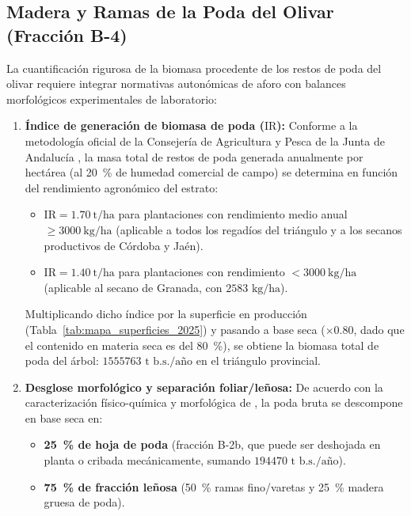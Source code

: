 \documentclass{report}
\begin{document}
\subsection{Madera y Ramas de la Poda del Olivar (Fracción B-4)}
La cuantificación rigurosa de la biomasa procedente de los restos de poda del olivar requiere integrar normativas autonómicas de aforo con balances morfológicos experimentales de laboratorio:
\begin{enumerate}
    \item \textbf{Índice de generación de biomasa de poda ($\text{IR}$):} Conforme a la metodología oficial de la Consejería de Agricultura y Pesca de la Junta de Andalucía \autocite[Sección~3.1.2, Tabla~3]{CAP2008}, la masa total de restos de poda generada anualmente por hectárea (al \SI{20}{\percent} de humedad comercial de campo) se determina en función del rendimiento agronómico del estrato:
    \begin{itemize}
        \item $\text{IR} = \SI{1.70}{\tonne/\hectare}$ para plantaciones con rendimiento medio anual $\ge \SI{3000}{\kilo\gram/\hectare}$ (aplicable a todos los regadíos del triángulo y a los secanos productivos de Córdoba y Jaén).
        \item $\text{IR} = \SI{1.40}{\tonne/\hectare}$ para plantaciones con rendimiento $< \SI{3000}{\kilo\gram/\hectare}$ (aplicable al secano de Granada, con $\num{2583}\text{ kg/ha}$).
    \end{itemize}
    Multiplicando dicho índice por la superficie en producción (Tabla~\ref{tab:mapa_superficies_2025}) y pasando a base seca ($\times 0.80$, dado que el contenido en materia seca es del \SI{80}{\percent}), se obtiene la biomasa total de poda del árbol: $\num{1555763}\text{ t b.s./año}$ en el triángulo provincial.
    \item \textbf{Desglose morfológico y separación foliar/leñosa:} De acuerdo con la caracterización físico-química y morfológica de \textcite{RomeroGarcia2014}, la poda bruta se descompone en base seca en:
    \begin{itemize}
        \item \textbf{\SI{25}{\percent} de hoja de poda} (fracción B-2b, que puede ser deshojada en planta o cribada mecánicamente, sumando $\num{194470}\text{ t b.s./año}$).
        \item \textbf{\SI{75}{\percent} de fracción leñosa} (\SI{50}{\percent} ramas fino/varetas y \SI{25}{\percent} madera gruesa de poda).
    \end{itemize}

\end{enumerate}
\end{document}
